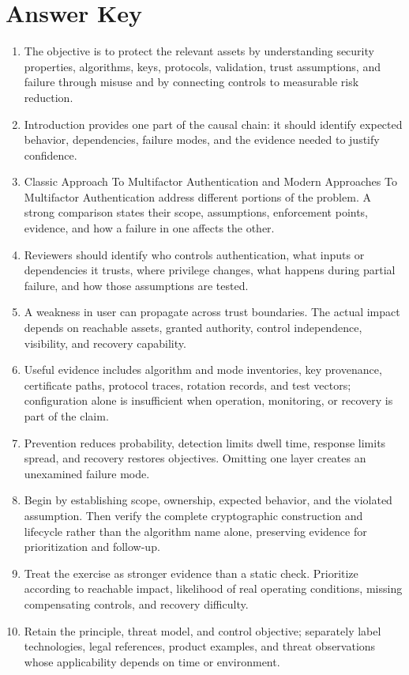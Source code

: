 \documentclass[11pt,letterpaper]{article}
\begin{document}
\section*{Answer Key}
\begin{enumerate}
\item The objective is to protect the relevant assets by understanding security properties, algorithms, keys, protocols, validation, trust assumptions, and failure through misuse and by connecting controls to measurable risk reduction.
\item Introduction provides one part of the causal chain: it should identify expected behavior, dependencies, failure modes, and the evidence needed to justify confidence.
\item Classic Approach To Multifactor Authentication and Modern Approaches To Multifactor Authentication address different portions of the problem. A strong comparison states their scope, assumptions, enforcement points, evidence, and how a failure in one affects the other.
\item Reviewers should identify who controls authentication, what inputs or dependencies it trusts, where privilege changes, what happens during partial failure, and how those assumptions are tested.
\item A weakness in user can propagate across trust boundaries. The actual impact depends on reachable assets, granted authority, control independence, visibility, and recovery capability.
\item Useful evidence includes algorithm and mode inventories, key provenance, certificate paths, protocol traces, rotation records, and test vectors; configuration alone is insufficient when operation, monitoring, or recovery is part of the claim.
\item Prevention reduces probability, detection limits dwell time, response limits spread, and recovery restores objectives. Omitting one layer creates an unexamined failure mode.
\item Begin by establishing scope, ownership, expected behavior, and the violated assumption. Then verify the complete cryptographic construction and lifecycle rather than the algorithm name alone, preserving evidence for prioritization and follow-up.
\item Treat the exercise as stronger evidence than a static check. Prioritize according to reachable impact, likelihood of real operating conditions, missing compensating controls, and recovery difficulty.
\item Retain the principle, threat model, and control objective; separately label technologies, legal references, product examples, and threat observations whose applicability depends on time or environment.
\end{enumerate}
\end{document}
